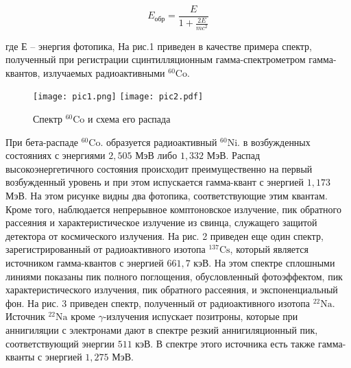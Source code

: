 \begin{equation}
  E_{\text{обр}} = \frac{E}{1 + \frac{2 E}{m c^2}}
\end{equation}

где $Е$ – энергия фотопика, На рис.1 приведен в качестве примера спектр,
полученный при регистрации сцинтилляционным гамма-спектрометром гамма-квантов,
излучаемых радиоактивными ${}^{60}{\text{Co}}$.

\begin{figure}[h!]
  \centering
  \texttt{[image: pic1.png]}
  \texttt{[image: pic2.pdf]}
  \caption{Спектр ${}^{60}{\text{Co}}$ и схема его распада}
  \label{pic:Cobalt}
\end{figure}

При бета-распаде ${}^{60}{\text{Co}}$. образуется радиоактивный
${}^{60}{\text{Ni}}$. в возбужденных состояниях с энергиями $2,505$ МэВ либо
$1,332$ МэВ. Распад высокоэнергетичного состояния происходит преимущественно на
первый возбужденный уровень и при этом испускается гамма-квант с энергией
$1,173$ МэВ. На этом рисунке видны два фотопика, соответствующие этим квантам.
Кроме того, наблюдается непрерывное комптоновское излучение, пик обратного
рассеяния и характеристическое излучение из свинца, служащего защитой детектора
от космического излучения. На рис. 2 приведен еще один спектр,
зарегистрированный от радиоактивного изотопа ${}^{137}{\text{Cs}}$, который
является источником гамма-квантов с энергией $661,7$ кэВ. На этом спектре
сплошными линиями показаны пик полного поглощения, обусловленный фотоэффектом,
пик характеристического излучения, пик обратного рассеяния, и экспоненциальный
фон. На рис. 3 приведен спектр, полученный от радиоактивного изотопа
${}^{22}{\text{Na}}$. Источник ${}^{22}{\text{Na}}$ кроме $\gamma$-излучения
испускает позитроны, которые при аннигиляции с электронами дают в спектре резкий
аннигиляционный пик, соответствующий энергии $511$ кэВ. В спектре этого
источника есть также гамма-кванты с энергией $1,275$ МэВ.
